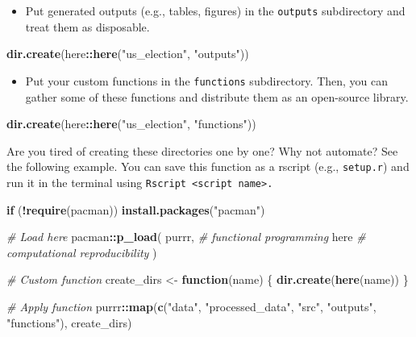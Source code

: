 \documentclass[
]{book}
\newenvironment{Shaded}{\begin{snugshade}}{\end{snugshade}}
\newcommand{\CommentTok}[1]{\textcolor[rgb]{0.56,0.35,0.01}{\textit{#1}}}
\newcommand{\ControlFlowTok}[1]{\textcolor[rgb]{0.13,0.29,0.53}{\textbf{#1}}}
\newcommand{\FunctionTok}[1]{\textcolor[rgb]{0.13,0.29,0.53}{\textbf{#1}}}
\newcommand{\NormalTok}[1]{#1}
\newcommand{\OtherTok}[1]{\textcolor[rgb]{0.56,0.35,0.01}{#1}}
\newcommand{\SpecialCharTok}[1]{\textcolor[rgb]{0.81,0.36,0.00}{\textbf{#1}}}
\newcommand{\StringTok}[1]{\textcolor[rgb]{0.31,0.60,0.02}{#1}}
\providecommand{\tightlist}{%
  \setlength{\itemsep}{0pt}\setlength{\parskip}{0pt}}
\begin{document}
\begin{itemize}
\tightlist
\item
  Put generated outputs (e.g., tables, figures) in the \texttt{outputs} subdirectory and treat them as disposable.
\end{itemize}

\begin{Shaded}
\begin{Highlighting}[]
\FunctionTok{dir.create}\NormalTok{(here}\SpecialCharTok{::}\FunctionTok{here}\NormalTok{(}\StringTok{"us\_election"}\NormalTok{, }\StringTok{"outputs"}\NormalTok{))}
\end{Highlighting}
\end{Shaded}

\begin{itemize}
\tightlist
\item
  Put your custom functions in the \texttt{functions} subdirectory. Then, you can gather some of these functions and distribute them as an open-source library.
\end{itemize}

\begin{Shaded}
\begin{Highlighting}[]
\FunctionTok{dir.create}\NormalTok{(here}\SpecialCharTok{::}\FunctionTok{here}\NormalTok{(}\StringTok{"us\_election"}\NormalTok{, }\StringTok{"functions"}\NormalTok{))}
\end{Highlighting}
\end{Shaded}

Are you tired of creating these directories one by one? Why not automate? See the following example. You can save this function as a rscript (e.g., \texttt{setup.r}) and run it in the terminal using \texttt{Rscript\ \textless{}script\ name\textgreater{}.}

\begin{Shaded}
\begin{Highlighting}[]
\ControlFlowTok{if}\NormalTok{ (}\SpecialCharTok{!}\FunctionTok{require}\NormalTok{(pacman)) }\FunctionTok{install.packages}\NormalTok{(}\StringTok{"pacman"}\NormalTok{)}

\CommentTok{\# Load here}
\NormalTok{pacman}\SpecialCharTok{::}\FunctionTok{p\_load}\NormalTok{(}
\NormalTok{  purrr, }\CommentTok{\# functional programming}
\NormalTok{  here }\CommentTok{\# computational reproducibility}
\NormalTok{)}

\CommentTok{\# Custom function}
\NormalTok{create\_dirs }\OtherTok{\textless{}{-}} \ControlFlowTok{function}\NormalTok{(name) \{}
  \FunctionTok{dir.create}\NormalTok{(}\FunctionTok{here}\NormalTok{(name))}
\NormalTok{\}}

\CommentTok{\# Apply function}
\NormalTok{purrr}\SpecialCharTok{::}\FunctionTok{map}\NormalTok{(}\FunctionTok{c}\NormalTok{(}\StringTok{"data"}\NormalTok{, }\StringTok{"processed\_data"}\NormalTok{, }\StringTok{"src"}\NormalTok{, }\StringTok{"outputs"}\NormalTok{, }\StringTok{"functions"}\NormalTok{), create\_dirs)}
\end{Highlighting}
\end{Shaded}
\end{document}
